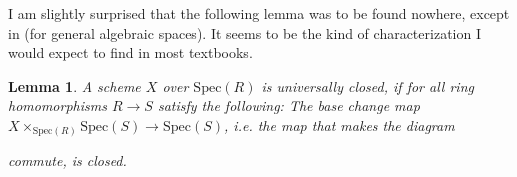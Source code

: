 \documentclass{scrartcl}
\newcommand{\Spec}{\mathrm{Spec}}
\newcommand{\citestacks}[1]{\cite[\href{https://stacks.math.columbia.edu/tag/#1}{Tag #1}]{stacks}}
\newtheorem{lemma}[subsection]{Lemma}
\theoremstyle{definition}
\begin{document}
I am slightly surprised that the following lemma was to be found nowhere, except in \citestacks{03IT} (for general algebraic spaces).
It seems to be the kind of characterization I would expect to find in most textbooks.
\begin{lemma}
    \label{prop:universally_closed_affines}
    A scheme $X$ over $\Spec(R)$ is universally closed, if for all ring homomorphisms $R \to S$ satisfy the following:
    The base change map $X \times_{\Spec(R)} \Spec(S) \to \Spec(S)$, i.e. the map that makes the diagram
    \begin{center}
    \end{center}
    commute, is closed.
\end{lemma}
\end{document}
